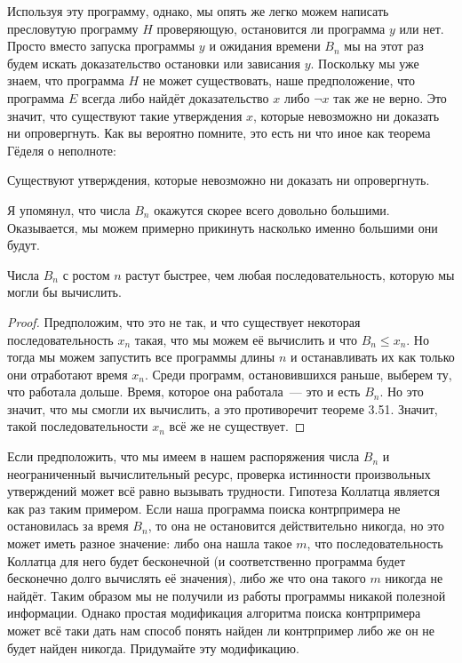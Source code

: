 Используя эту программу, однако, мы опять же легко можем написать пресловутую программу $H$ проверяющую, остановится ли программа $y$ или нет. Просто вместо запуска программы $y$ и ожидания времени $B_n$ мы на этот раз будем искать доказательство остановки или зависания $y$. Поскольку мы уже знаем, что программа $H$ не может существовать, наше предположение, что программа $E$ всегда либо найдёт доказательство $x$ либо $\neg x$ так же не верно. Это значит, что существуют такие утверждения $x$, которые невозможно ни доказать ни опровергнуть. Как вы вероятно помните, это есть ни что иное как теорема Гёделя о неполноте:

\begin{thm}
Существуют утверждения, которые невозможно ни доказать ни опровергнуть.
\end{thm}

Я упомянул, что числа $B_n$ окажутся скорее всего довольно большими. Оказывается, мы можем примерно прикинуть насколько именно большими они будут.

\begin{thm}
Числа $B_n$ с ростом $n$ растут быстрее, чем любая последовательность, которую мы могли бы вычислить.
\end{thm}
\begin{proof}
Предположим, что это не так, и что существует некоторая последовательность $x_n$ такая, что мы можем её вычислить и что $B_n\le x_n$. Но тогда мы можем запустить все программы длины $n$ и останавливать их как только они отработают время $x_n$. Среди программ, остановившихся раньше, выберем ту, что работала дольше. Время, которое она работала~--- это и есть $B_n$. Но это значит, что мы смогли их вычислить, а это противоречит теореме 3.51. Значит, такой последовательности $x_n$ всё же не существует.
\end{proof}

\begin{exercise}
Если предположить, что мы имеем в нашем распоряжения числа $B_n$ и неограниченный вычислительный ресурс, проверка истинности произвольных утверждений может всё равно вызывать трудности. Гипотеза Коллатца является как раз таким примером. Если наша программа поиска контрпримера не остановилась за время $B_n$, то она не остановится действительно никогда, но это может иметь разное значение: либо она нашла такое $m$, что последовательность Коллатца для него будет бесконечной (и соответственно программа будет бесконечно долго вычислять её значения), либо же что она такого $m$ никогда не найдёт. Таким образом мы не получили из работы программы никакой полезной информации. Однако простая модификация алгоритма поиска контрпримера может всё таки дать нам способ понять найден ли контрпример либо же он не будет найден никогда. Придумайте эту модификацию.
\end{exercise}

